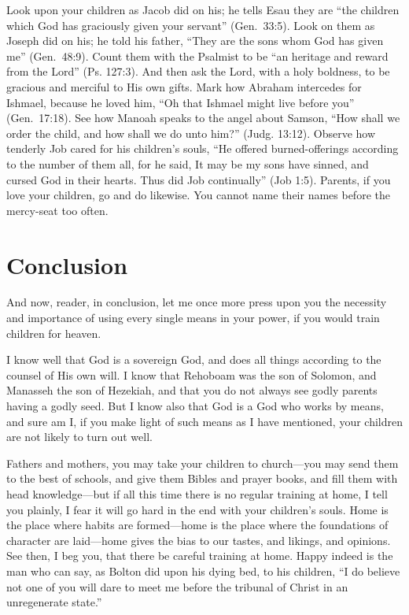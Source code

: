 \documentclass[
]{book}
\begin{document}
Look upon your children as Jacob did on his; he tells Esau they are ``the children which God has graciously given your servant'' (Gen.~33:5). Look on them as Joseph did on his; he told his father, ``They are the sons whom God has given me'' (Gen.~48:9). Count them with the Psalmist to be ``an heritage and reward from the Lord'' (Ps. 127:3). And then ask the Lord, with a holy boldness, to be gracious and merciful to His own gifts. Mark how Abraham intercedes for Ishmael, because he loved him, ``Oh that Ishmael might live before you'' (Gen.~17:18). See how Manoah speaks to the angel about Samson, ``How shall we order the child, and how shall we do unto him?'' (Judg. 13:12). Observe how tenderly Job cared for his children's souls, ``He offered burned-offerings according to the number of them all, for he said, It may be my sons have sinned, and cursed God in their hearts. Thus did Job continually'' (Job 1:5). Parents, if you love your children, go and do likewise. You cannot name their names before the mercy-seat too often.

\hypertarget{conclusion}{%
\section*{Conclusion}\label{conclusion}}

And now, reader, in conclusion, let me once more press upon you the necessity and importance of using every single means in your power, if you would train children for heaven.

I know well that God is a sovereign God, and does all things according to the counsel of His own will. I know that Rehoboam was the son of Solomon, and Manasseh the son of Hezekiah, and that you do not always see godly parents having a godly seed. But I know also that God is a God who works by means, and sure am I, if you make light of such means as I have mentioned, your children are not likely to turn out well.

Fathers and mothers, you may take your children to church---you may send them to the best of schools, and give them Bibles and prayer books, and fill them with head knowledge---but if all this time there is no regular training at home, I tell you plainly, I fear it will go hard in the end with your children's souls. Home is the place where habits are formed---home is the place where the foundations of character are laid---home gives the bias to our tastes, and likings, and opinions. See then, I beg you, that there be careful training at home. Happy indeed is the man who can say, as Bolton did upon his dying bed, to his children, ``I do believe not one of you will dare to meet me before the tribunal of Christ in an unregenerate state.''
\end{document}
